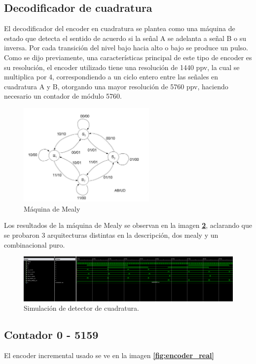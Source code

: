 \documentclass[11pt, a4paper]{article}
\begin{document}
		
		\subsection{Decodificador de cuadratura}
			El decodificador del encoder en cuadratura se plantea como una máquina de estado que detecta el sentido de acuerdo si la señal A se adelanta a señal B o su inversa. Por cada transición del nivel bajo hacia alto o bajo se produce un pulso. Como se dijo previamente, una características principal de este tipo de encoder es su resolución, el encoder utilizado tiene una resolución de 1440 ppv, la cual se multiplica por 4, correspondiendo a un ciclo entero entre las señales en cuadratura A y B, otorgando una mayor resolución de 5760 ppv, haciendo necesario un contador de módulo 5760.
		\begin{figure}[H]
			\centering
			\includegraphics[width=0.6\textwidth]{Imagenes/mealy.jpg}
			\caption{Máquina de Mealy}
			\label{fig:mealy}
		\end{figure} 
		
		Los resultados de la máquina de Mealy se observan en la imagen \textcolor{blue}{\textbf{\ref{fig:mealy_tb}}}, aclarando que se probaron 3 arquitecturas distintas en la descripción, dos mealy y un combinacional puro.

		\begin{figure}[H]
			\centering
			\includegraphics[width=\textwidth]{Imagenes/tb_mealy.png}
			\caption{Simulación de detector de cuadratura.}
			\label{fig:mealy_tb}
		\end{figure} 

		\subsection{Contador 0 - 5159}
			El encoder incremental usado se ve en la imagen \textcolor{blue}{\textbf{\ref{fig:encoder_real}}} 
\end{document}
